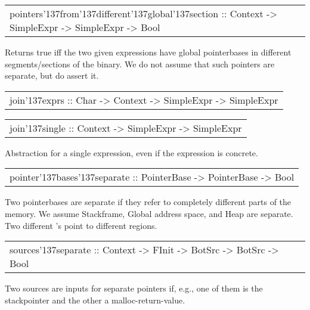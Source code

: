 \begin{haddockdesc}
\item[\begin{tabular}{@{}l}
pointers{\char '137}from{\char '137}different{\char '137}global{\char '137}section :: Context -> SimpleExpr -> SimpleExpr -> Bool
\end{tabular}]
{\haddockbegindoc
Returns true iff the two given expressions have global pointerbases in different segments/sections of the binary.
 We do not assume that such pointers are separate, but do assert it.\par}
\end{haddockdesc}
\begin{haddockdesc}
\item[\begin{tabular}{@{}l}
join{\char '137}exprs :: {\char 91}Char{\char 93} -> Context -> {\char 91}SimpleExpr{\char 93} -> SimpleExpr
\end{tabular}]
\end{haddockdesc}
\begin{haddockdesc}
\item[\begin{tabular}{@{}l}
join{\char '137}single :: Context -> SimpleExpr -> SimpleExpr
\end{tabular}]
{\haddockbegindoc
Abstraction for a single expression, even if the expression is concrete.\par}
\end{haddockdesc}
\begin{haddockdesc}
\item[\begin{tabular}{@{}l}
pointer{\char '137}bases{\char '137}separate :: PointerBase -> PointerBase -> Bool
\end{tabular}]
{\haddockbegindoc
Two pointerbases are separate if they refer to completely different parts of the memory.
 We assume Stackframe, Global address space, and Heap are separate.
 Two different 's point to different regions.\par}
\end{haddockdesc}
\begin{haddockdesc}
\item[\begin{tabular}{@{}l}
sources{\char '137}separate :: Context -> FInit -> BotSrc -> BotSrc -> Bool
\end{tabular}]
{\haddockbegindoc
Two sources are inputs for separate pointers if, e.g., one of them is the stackpointer and the other a malloc-return-value.\par}
\end{haddockdesc}
